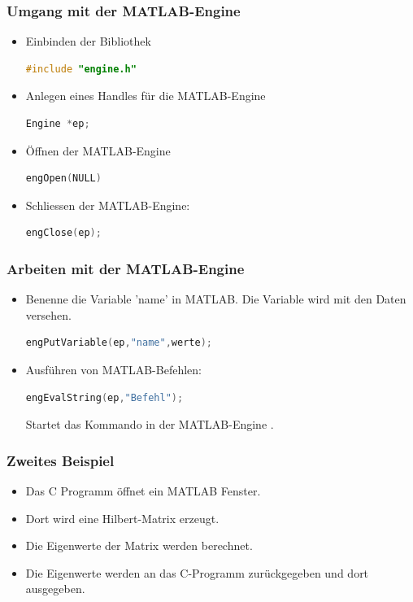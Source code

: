 \documentclass[hyperref={xetex}]{beamer}
\begin{document}
\begin{frame}[fragile]\frametitle{Umgang mit der MATLAB-Engine}
\begin{itemize}
\item Einbinden der Bibliothek 
\begin{lstlisting}[language=C++]
#include "engine.h"
\end{lstlisting}
\item Anlegen eines Handles f\"ur die MATLAB-Engine
\begin{lstlisting}[language=C++]
Engine *ep;
\end{lstlisting}
\item \"Offnen der MATLAB-Engine
\begin{lstlisting}[language=C++]
engOpen(NULL) 
\end{lstlisting} 
\item Schliessen der MATLAB-Engine: 
\begin{lstlisting}[language=C++]
engClose(ep);
\end{lstlisting}
\end{itemize}
\end{frame}
%
%
\begin{frame}[fragile]\frametitle{Arbeiten mit der MATLAB-Engine}
\begin{itemize}
\item  Benenne die Variable 'name' in MATLAB. Die Variable wird mit den Daten
 versehen. 
\begin{lstlisting}[language=C++]
 engPutVariable(ep,"name",werte);
\end{lstlisting}
\item Ausf\"uhren von MATLAB-Befehlen:
\begin{lstlisting}[language=C++]
engEvalString(ep,"Befehl");
\end{lstlisting}
Startet das Kommando  in der MATLAB-Engine .
\end{itemize}
\end{frame}
%
%
\begin{frame}[fragile]\frametitle{Zweites Beispiel}
\begin{itemize}
\item Das C Programm \"offnet ein MATLAB Fenster.
\item Dort wird eine Hilbert-Matrix erzeugt.
\item Die Eigenwerte der Matrix werden berechnet.
\item Die Eigenwerte werden an das C-Programm zur\"uckgegeben und dort
  ausgegeben. 
\end{itemize}
\end{frame}
\end{document}
